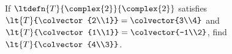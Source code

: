 If $\ltdefn{T}{\complex{2}}{\complex{2}}$ satisfies 
$\lt{T}{\colvector{2\\1}} = \colvector{3\\4}$ 
and 
$\lt{T}{\colvector{1\\1}} = \colvector{-1\\2}$, 
find 
$\lt{T}{\colvector{4\\3}}$.